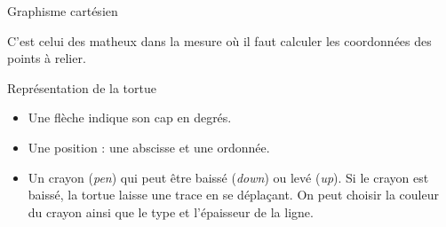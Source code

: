 \documentclass[10pt]{beamer}
\begin{document}
\begin{frame}{Graphisme cartésien}

  C'est celui des matheux dans la mesure où il faut calculer les coordonnées des points à relier.

  \begin{block}{Représentation de la tortue}
    \begin{itemize}
    \item Une flèche indique son \alert{cap} en degrés.
    \item Une \alert{position} : une abscisse et une ordonnée.
    \item Un \alert{crayon} (\emph{pen}) qui peut être baissé (\emph{down}) ou levé (\emph{up}).
      Si le crayon est baissé, la tortue laisse une trace en se déplaçant.
      On peut choisir la couleur du crayon ainsi que le type et l’épaisseur de la ligne.
  \end{itemize}
\end{block}

\begin{center}
  \end{center}
\end{frame}
\end{document}
